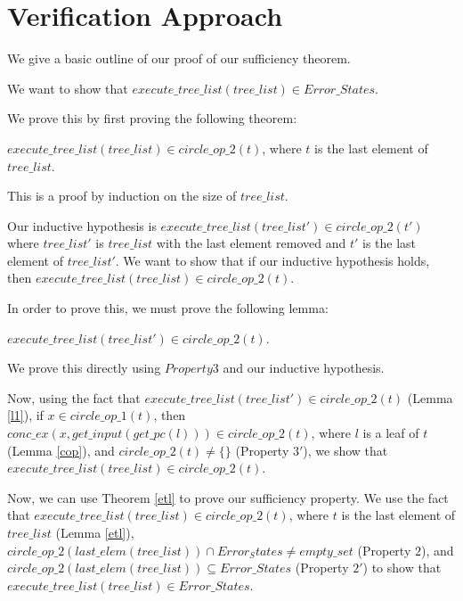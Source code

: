 \section{Verification Approach}
We give a basic outline of our proof of our sufficiency theorem.

We want to show that $execute\_tree\_list (tree\_list) \in Error\_States$.

We prove this by first proving the following theorem:
\begin{theorem} \label{etl}
 $execute\_tree\_list (tree\_list) \in circle\_op\_2 (t)$, where $t$ is the last element of $tree\_list$.
\end{theorem}

This is a proof by induction on the size of $tree\_list$.

Our inductive hypothesis is  $execute\_tree\_list (tree\_list') \in circle\_op\_2 (t')$ where $tree\_list'$ is $tree\_list$ with the last element removed and $t'$ is the last element of $tree\_list'$.
We want to show that if our inductive hypothesis holds, then $execute\_tree\_list (tree\_list) \in circle\_op\_2 (t)$.

In order to prove this, we must prove the following lemma:
\begin{lemma} \label{l1}
$execute\_tree\_list (tree\_list') \in circle\_op\_2 (t)$.
\end{lemma}
We prove this directly using $Property 3$ and our inductive hypothesis.

Now, using the fact that $execute\_tree\_list (tree\_list') \in circle\_op\_2 (t)$ (Lemma \ref{l1}),
if $x \in circle\_op\_1(t)$, then  $conc\_ex(x, get\_input (get\_pc (l))) \in circle\_op\_2(t)$,
where $l$ is a leaf of $t$ (Lemma \ref{cop}), and $circle\_op\_2(t) \neq \{\} $ (Property $3'$),
we show that $execute\_tree\_list (tree\_list) \in circle\_op\_2 (t)$.

Now, we can use Theorem \ref{etl} to prove our sufficiency property.
We use the fact that  $execute\_tree\_list (tree\_list) \in circle\_op\_2 (t)$, where $t$ is the last element of $tree\_list$ (Lemma \ref{etl}),
$ circle\_op\_2 (last\_elem (tree\_list)) \cap Error_States \neq empty\_set $ (Property $2$), and 
$circle\_op\_2 (last\_elem (tree\_list)) \subseteq Error\_States $ (Property $2'$)
to show that 
$execute\_tree\_list (tree\_list) \in Error\_States$.



